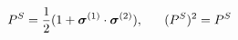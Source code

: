 \begin{equation}
P^{S} = \frac{1}{2} (1 + \mbox{\boldmath $\sigma$}^{(1)} \cdot \mbox{\boldmath 
$\sigma$}^{(2)}) , ~~~~~(P^{S})^{2} = P^{S}                        \label{eq:hp}
\end{equation}

